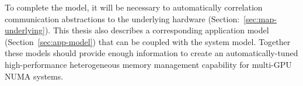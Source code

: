 To complete the model, it will be necessary to automatically correlation communication abstractions to the underlying hardware (Section:~\ref{sec:map-underlying}).
This thesis also describes a corresponding application model (Section~\ref{sec:app-model}) that can be coupled with the system model.
Together these models should provide enough information to create an automatically-tuned high-performance heterogeneous memory management capability for multi-GPU NUMA systems.
